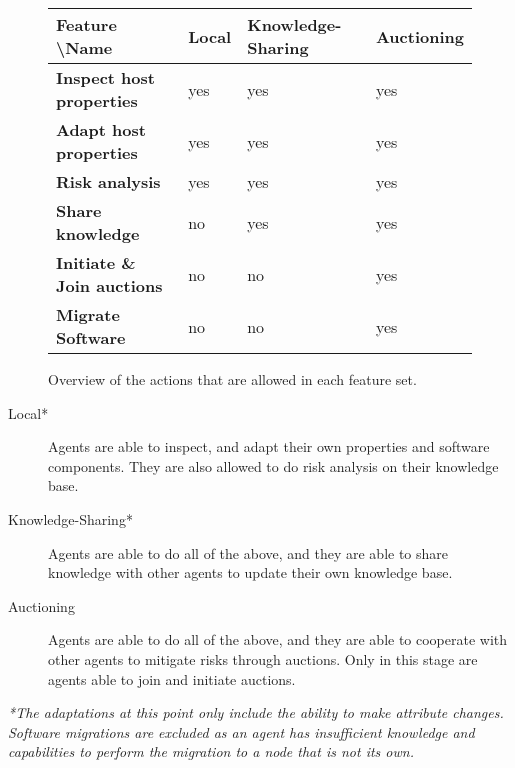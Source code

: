 \begin{figure}[H]
        \centering
        \begin{tabular}{l|l|l|l}
            \textbf{Feature \textbackslash Name} & \textbf{Local} & \textbf{Knowledge-Sharing} & \textbf{Auctioning} \\ \hline
            \textbf{Inspect host properties}     & yes            & yes                        & yes                 \\
            \textbf{Adapt host properties}       & yes            & yes                        & yes                 \\
            \textbf{Risk analysis}               & yes            & yes                        & yes                 \\
            \textbf{Share knowledge}             & no             & yes                        & yes                 \\
            \textbf{Initiate \& Join auctions}   & no             & no                         & yes                 \\
            \textbf{Migrate Software}            & no             & no                         & yes                            
        \end{tabular}
        \caption{\label{fig:experiment-features}Overview of the actions that are allowed in each feature set. }
\end{figure}

\begin{description}
    \item[Local*]             Agents are able to inspect, and adapt their own properties and software components. They are also allowed to do risk analysis on their knowledge base. 
    \item[Knowledge-Sharing*] Agents are able to do all of the above, and they are able to share knowledge with other agents to update their own knowledge base.
    \item[Auctioning]         Agents are able to do all of the above, and they are able to cooperate with other agents to mitigate risks through auctions. Only in this stage are agents able to join and initiate auctions.
\end{description}

{\small \textit{*The adaptations at this point only include the ability to make attribute changes. Software migrations are excluded as an agent has insufficient knowledge and capabilities to perform the migration to a node that is not its own.}}


